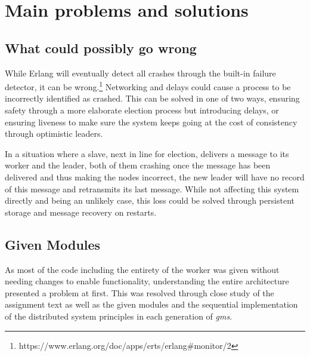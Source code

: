 \documentclass[a4paper, 11pt]{article}
\begin{document}
\section{Main problems and solutions}

\subsection{What could possibly go wrong}


While Erlang will eventually detect all crashes through the built-in failure detector, it can be wrong.\footnote{https://www.erlang.org/doc/apps/erts/erlang\#monitor/2}
Networking and delays could cause a process to be incorrectly identified as crashed.
This can be solved in one of two ways, ensuring safety through a more elaborate election process but introducing delays,
or ensuring liveness to make sure the system keeps going at the cost of consistency through optimistic leaders.


In a situation where a slave, next in line for election, delivers a message to its worker and the leader, both of them crashing once the message has been delivered and thus making the nodes incorrect,
the new leader will have no record of this message and retransmits its last message. While not affecting this system directly and being an unlikely case, this loss could be solved through persistent storage and message recovery on restarts.

\subsection{Given Modules}

As most of the code including the entirety of the worker was given without needing changes to enable functionality, understanding the entire architecture presented a problem at first.
This was resolved through close study of the assignment text as well as the given modules and the sequential implementation of the distributed system principles in each generation of \textit{gms}.
\end{document}
